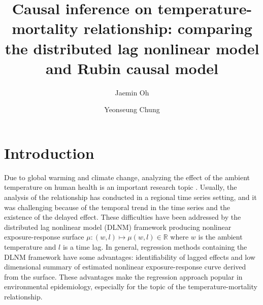 \documentclass[12pt]{article}
\author[1]{Jaemin Oh}
\author[2]{Yeonseung Chung}
\affil[1,2]{Department of Mathematical Sciences, 
KAIST, Daejeon, South Korea}
\title{
	Causal inference on temperature-mortality relationship: 
	comparing the distributed lag nonlinear model and Rubin causal model
	} %
\begin{document}
\maketitle



\section{Introduction}

Due to global warming and climate change,
analyzing the effect of the ambient temperature on human health is an important research topic
\cite{gasparrini2015, yoonhee2019, temperaturemorbidity}.
Usually, the analysis of the relationship has conducted in a regional time series setting,
and it was challenging because of the temporal trend in the time series and the existence of the delayed effect.
These difficulties have been addressed by 
the distributed lag nonlinear model (DLNM) framework\cite{dlnm2010}
producing nonlinear exposure-response surface
$\mu : (w, l) \mapsto \mu(w,l) \in \mathbb{R}$ where $w$ is the ambient temperature and $l$ is a time lag.
In general, regression methods containing the DLNM framework have some advantages:
identifiability of lagged effects and
low dimensional summary of estimated nonlinear exposure-response curve derived from the surface.
These advantages make the regression approach popular in environmental epidemiology,
especially for the topic of the temperature-mortality relationship.
\end{document}
